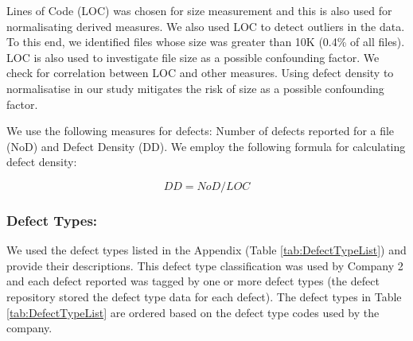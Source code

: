\documentclass[times]{smrauth}
\begin{document}
Lines of Code (LOC) was chosen for size measurement and this is also used for normalisating derived measures. We also used LOC to detect outliers in the data. To this end, we identified files whose size was greater than 10K (0.4\% of all files). LOC is also used to investigate file size as a possible confounding factor. We check for correlation between LOC and other measures. Using defect density to normalisatise in our study mitigates the risk of size as a possible confounding factor.



We use the following measures for defects: Number of  defects reported for a file (NoD) and Defect Density (DD). We employ the following formula for calculating defect density:

 \[
  DD = NoD / LOC 
 \]
 

\subsubsection{Defect Types:}

We used the defect types listed in the Appendix (Table \ref{tab:DefectTypeList}) and provide their descriptions. 
This defect type classification was used by Company 2 and each defect reported was tagged by one or more defect types (the defect repository stored the defect type data for each defect). The defect types in Table \ref{tab:DefectTypeList} are ordered based on the defect type codes used by the company.

\end{document}
